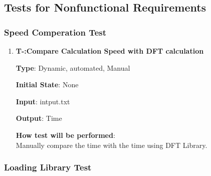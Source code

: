 \documentclass[12pt, titlepage]{article}
\newcounter{tnum}
\begin{document}
\subsection{Tests for Nonfunctional Requirements}

\subsubsection{Speed Comperation Test}
\begin{enumerate}

\item{\textbf{T-\thetnum \label{R3RIFFT}:Compare Calculation Speed with DFT calculation}}

\textbf {Type}: Dynamic, automated, Manual
					
\textbf {Initial State}: None
					
\textbf {Input}: intput.txt
					
\textbf {Output}: Time
					
\textbf {How test will be performed}: \\
Manually compare the time with the time using DFT Library.

\end{enumerate}

\subsubsection{Loading Library Test}
\end{document}
